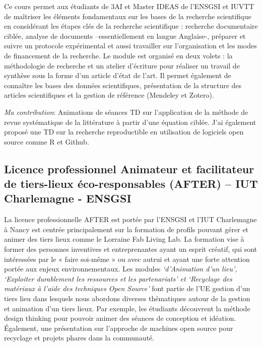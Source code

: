 \documentclass[
  11pt,
]{article}
\begin{document}
Ce cours permet aux étudiants de 3AI et Master IDEAS de l'ENSGSI et
IUVTT de maîtriser les éléments fondamentaux sur les bases de la
recherche scientifique en considérant les étapes clés de la recherche
scientifique : recherche documentaire ciblée, analyse de documents
--essentiellement en langue Anglaise-, préparer et suivre un protocole
expérimental et aussi travailler sur l'organisation et les modes de
financement de la recherche. Le module est organisé en deux volets : la
méthodologie de recherche et un atelier d'écriture pour réaliser un
travail de synthèse sous la forme d'un article d'état de l'art. Il
permet également de connaître les bases des données scientifiques,
présentation de la structure des articles scientifiques et la gestion de
référence (Mendeley et Zotero).

\emph{Ma contribution}: Animations de séances TD sur l'application de la
méthode de revue systématique de la littérature à partir d'une équation
ciblée. J'ai également proposé une TD sur la recherche reproductible en
utilisation de logiciels open source comme R et Github.

\hypertarget{licence-professionnel-animateur-et-facilitateur-de-tiers-lieux-uxe9co-responsables-after-iut-charlemagne---ensgsi}{%
\subsection{Licence professionnel Animateur et facilitateur de
tiers-lieux éco-responsables (AFTER) -- IUT Charlemagne -
ENSGSI}\label{licence-professionnel-animateur-et-facilitateur-de-tiers-lieux-uxe9co-responsables-after-iut-charlemagne---ensgsi}}

La licence professionnelle AFTER est portée par l'ENSGSI et l'IUT
Charlemagne à Nancy est centrée principalement sur la formation de
profils pouvant gérer et animer des tiers lieux comme le Lorraine Fab
Living Lab. La formation vise à former des personnes inventives et
entreprenantes ayant un esprit créatif, qui sont intéressées par le «
faire soi-même » ou avec autrui et ayant une forte attention portée aux
enjeux environnementaux. Les modules \emph{`d'Animation d'un lieu',
`Exploiter durablement les ressources et les partenariats' et `Recyclage
des matériaux à l'aide des techniques Open Source'} font partie de l'UE
gestion d'un tiers lieu dans lesquels nous abordons diverses thématiques
autour de la gestion et animation d'un tiers lieux. Par exemple, les
étudiants découvrent la méthode design thinking pour pouvoir animer des
séances de conception et idéation. Également, une présentation sur
l'approche de machines open source pour recyclage et projets phares dans
la communauté.
\end{document}

